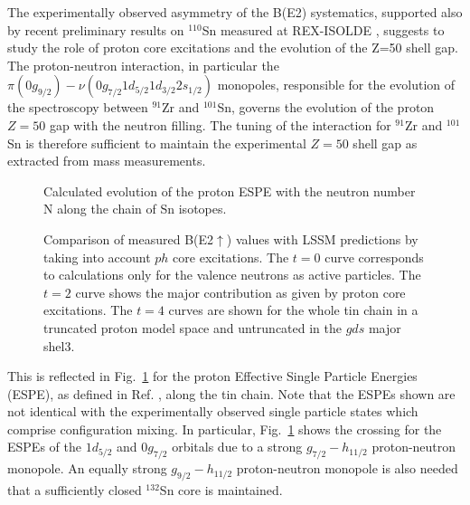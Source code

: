 \documentclass[prc,twocolumn,amssymb,amsmath,showpacs,superscriptaddress]{revtex4}
\begin{document}
The experimentally observed asymmetry of the B(E2) systematics,
supported also by recent preliminary results on $^{110}$Sn
measured at REX-ISOLDE \cite{ced05}, suggests to study the role of
proton core excitations and the evolution of the Z=50 shell gap.
The proton-neutron interaction, in particular the
$\pi(0g_{9/2})-\nu(0g_{7/2}1d_{5/2}1d_{3/2}2s_{1/2})$ monopoles,
responsible for the evolution of the spectroscopy between
$^{91}$Zr and $^{101}$Sn, governs the evolution of the proton
$Z=50$ gap with the neutron filling. The tuning of the interaction
for $^{91}$Zr and $^{101}$Sn is therefore sufficient to maintain
the experimental $Z=50$ shell gap as extracted from mass
measurements.
\begin{figure}[hhh]\hspace{-0.5cm}
\centering\mbox{}
\vspace{-15pt}\caption{\small Calculated evolution of the proton
ESPE with the neutron number N along the chain of Sn isotopes.}
\label{fig:ESPE}
\end{figure}
\begin{figure}[!t]\hspace{-0.5cm}
\centering\mbox{}
\vspace{-15pt}\caption{\small Comparison of measured
B(E2$\uparrow$) values with LSSM predictions by taking into
account $ph$ core excitations. The $t=0$ curve corresponds to
calculations only for the valence neutrons as active particles.
The $t=2$ curve shows the major contribution as given by proton
core excitations. The $t=4$ curves are shown for the whole tin
chain in a truncated proton model space and untruncated in the
$gds$ major shel3.}\label{fig:systematics2}
\end{figure}
This is reflected in Fig.~\ref{fig:ESPE} for the proton Effective
Single Particle Energies (ESPE), as defined in Ref. \cite{ots01},
along the tin chain. Note that the ESPEs shown are not identical
with the experimentally observed single particle states which
comprise configuration mixing. In particular, Fig.~\ref{fig:ESPE}
shows the crossing for the ESPEs of the $1d_{5/2}$ and $0g_{7/2}$
orbitals due to a strong $g_{7/2} - h_{11/2}$ proton-neutron
monopole. An equally strong $g_{9/2} - h_{11/2}$ proton-neutron
monopole is also needed that a sufficiently closed $^{132}$Sn core
is maintained.
\end{document}
